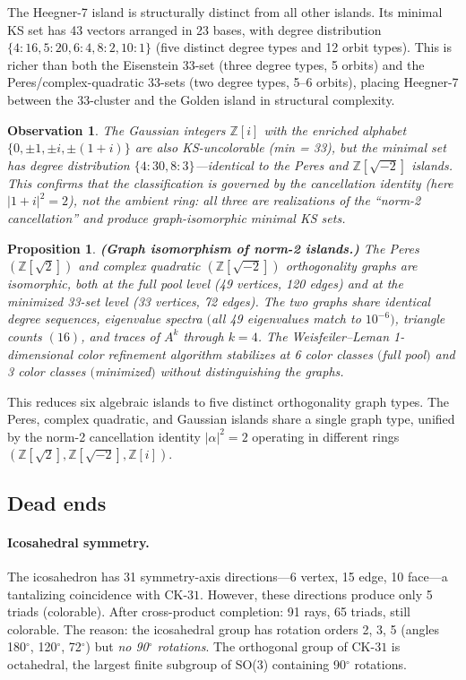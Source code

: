\documentclass[12pt,a4paper]{article}
\newtheorem{proposition}[theorem]{Proposition}
\newtheorem{observation}[theorem]{Observation}
\newcommand{\Z}{\mathbb{Z}}
\newcommand{\CK}{\mathrm{CK}\text{-}31}
\begin{document}
The Heegner-7 island is structurally distinct from all other islands. Its minimal KS set has 43 vectors arranged in 23 bases, with degree distribution $\{4{:}16, 5{:}20, 6{:}4, 8{:}2, 10{:}1\}$ (five distinct degree types and 12 orbit types). This is richer than both the Eisenstein 33-set (three degree types, 5 orbits) and the Peres/complex-quadratic 33-sets (two degree types, 5--6 orbits), placing Heegner-7 between the 33-cluster and the Golden island in structural complexity.

\begin{observation}\label{obs:gaussian}
The Gaussian integers $\Z[i]$ with the enriched alphabet $\{0, \pm 1, \pm i, \pm(1+i)\}$ are also KS-uncolorable (min = 33), but the minimal set has degree distribution $\{4{:}30, 8{:}3\}$---identical to the Peres and $\Z[\sqrt{-2}]$ islands. This confirms that the classification is governed by the cancellation identity (here $|1+i|^2 = 2$), not the ambient ring: all three are realizations of the ``norm-2 cancellation'' and produce graph-isomorphic minimal KS sets.
\end{observation}

\begin{proposition}\label{prop:isomorphism}
\textbf{(Graph isomorphism of norm-2 islands.)} The Peres $(\Z[\sqrt{2}])$ and complex quadratic $(\Z[\sqrt{-2}])$ orthogonality graphs are isomorphic, both at the full pool level (49 vertices, 120 edges) and at the minimized 33-set level (33 vertices, 72 edges). The two graphs share identical degree sequences, eigenvalue spectra $($all 49 eigenvalues match to $10^{-6})$, triangle counts $(16)$, and traces of $A^k$ through $k = 4$. The Weisfeiler--Leman 1-dimensional color refinement algorithm stabilizes at 6 color classes $($full pool$)$ and 3 color classes $($minimized$)$ without distinguishing the graphs.
\end{proposition}

This reduces six algebraic islands to five distinct orthogonality graph types. The Peres, complex quadratic, and Gaussian islands share a single graph type, unified by the norm-2 cancellation identity $|\alpha|^2 = 2$ operating in different rings $(\Z[\sqrt{2}], \Z[\sqrt{-2}], \Z[i])$.

\subsection{Dead ends}

\paragraph{Icosahedral symmetry.} The icosahedron has 31 symmetry-axis directions---6 vertex, 15 edge, 10 face---a tantalizing coincidence with $\CK$. However, these directions produce only 5 triads (colorable). After cross-product completion: 91 rays, 65 triads, still colorable. The reason: the icosahedral group has rotation orders 2, 3, 5 (angles 180$^\circ$, 120$^\circ$, 72$^\circ$) but \emph{no 90$^\circ$ rotations}. The orthogonal group of $\CK$ is octahedral, the largest finite subgroup of SO(3) containing 90$^\circ$ rotations.
\end{document}

